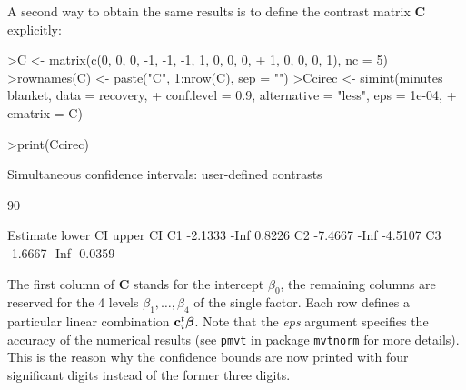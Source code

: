 \documentclass{article}
\newcommand{\bbeta}{\mbox{\boldmath $\beta$}}
\newcommand{\bc}{{\mathbf{c}}}
\newcommand{\bC}{{\mathbf{C}}}
\begin{document}
A second way to obtain the same results is to define the contrast
matrix $\bC$ explicitly:
\small
\begin{Schunk}
\begin{Sinput}
>C <- matrix(c(0, 0, 0, -1, -1, -1, 1, 0, 0, 0, 
+     1, 0, 0, 0, 1), nc = 5)
>rownames(C) <- paste("C", 1:nrow(C), sep = "")
>Ccirec <- simint(minutes ~ blanket, data = recovery, 
+     conf.level = 0.9, alternative = "less", eps = 1e-04, 
+     cmatrix = C)
\end{Sinput}
\end{Schunk}
\begin{Schunk}
\begin{Sinput}
>print(Ccirec)
\end{Sinput}
\begin{Soutput}
	Simultaneous confidence intervals: user-defined
	contrasts

	90 % confidence intervals

   Estimate lower CI upper CI
C1  -2.1333     -Inf   0.8226
C2  -7.4667     -Inf  -4.5107
C3  -1.6667     -Inf  -0.0359
\end{Soutput}
\end{Schunk}
\normalsize
The first column of $\bC$ stands for the intercept $\beta_0$, the
remaining columns are reserved for the 4 levels $\beta_1, \dots,
\beta_4$ of the single factor. Each row defines a particular
linear combination $\bc_i^t \bbeta$. Note that the {\em eps} argument
specifies the accuracy of the numerical results (see \texttt{pmvt} in package
\texttt{mvtnorm} for more details). This is the reason why
the confidence bounds are now printed with four significant digits 
instead of the former three digits.
\end{document}
